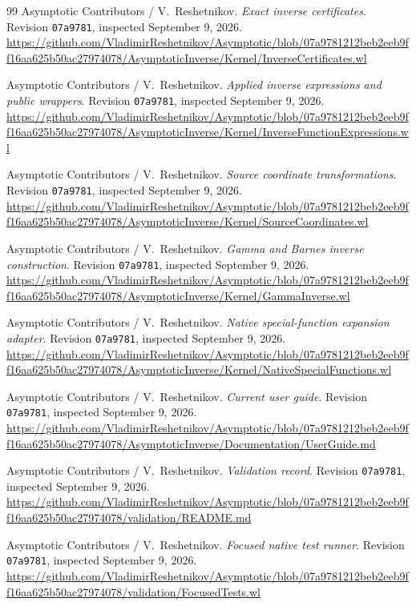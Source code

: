 \documentclass[11pt,a4paper]{article}
\theoremstyle{remark}\newtheorem{remark}[proposition]{Remark}
\begin{document}
\begin{thebibliography}{99}
 Asymptotic Contributors / V.~Reshetnikov. \emph{Exact inverse certificates}. Revision \texttt{07a9781}, inspected September 9, 2026. \url{https://github.com/VladimirReshetnikov/Asymptotic/blob/07a9781212beb2eeb9ff16aa625b50ac27974078/AsymptoticInverse/Kernel/InverseCertificates.wl}

 Asymptotic Contributors / V.~Reshetnikov. \emph{Applied inverse expressions and public wrappers}. Revision \texttt{07a9781}, inspected September 9, 2026. \url{https://github.com/VladimirReshetnikov/Asymptotic/blob/07a9781212beb2eeb9ff16aa625b50ac27974078/AsymptoticInverse/Kernel/InverseFunctionExpressions.wl}

 Asymptotic Contributors / V.~Reshetnikov. \emph{Source coordinate transformations}. Revision \texttt{07a9781}, inspected September 9, 2026. \url{https://github.com/VladimirReshetnikov/Asymptotic/blob/07a9781212beb2eeb9ff16aa625b50ac27974078/AsymptoticInverse/Kernel/SourceCoordinates.wl}

 Asymptotic Contributors / V.~Reshetnikov. \emph{Gamma and Barnes inverse construction}. Revision \texttt{07a9781}, inspected September 9, 2026. \url{https://github.com/VladimirReshetnikov/Asymptotic/blob/07a9781212beb2eeb9ff16aa625b50ac27974078/AsymptoticInverse/Kernel/GammaInverse.wl}

 Asymptotic Contributors / V.~Reshetnikov. \emph{Native special-function expansion adapter}. Revision \texttt{07a9781}, inspected September 9, 2026. \url{https://github.com/VladimirReshetnikov/Asymptotic/blob/07a9781212beb2eeb9ff16aa625b50ac27974078/AsymptoticInverse/Kernel/NativeSpecialFunctions.wl}

 Asymptotic Contributors / V.~Reshetnikov. \emph{Current user guide}. Revision \texttt{07a9781}, inspected September 9, 2026. \url{https://github.com/VladimirReshetnikov/Asymptotic/blob/07a9781212beb2eeb9ff16aa625b50ac27974078/AsymptoticInverse/Documentation/UserGuide.md}

 Asymptotic Contributors / V.~Reshetnikov. \emph{Validation record}. Revision \texttt{07a9781}, inspected September 9, 2026. \url{https://github.com/VladimirReshetnikov/Asymptotic/blob/07a9781212beb2eeb9ff16aa625b50ac27974078/validation/README.md}

 Asymptotic Contributors / V.~Reshetnikov. \emph{Focused native test runner}. Revision \texttt{07a9781}, inspected September 9, 2026. \url{https://github.com/VladimirReshetnikov/Asymptotic/blob/07a9781212beb2eeb9ff16aa625b50ac27974078/validation/FocusedTests.wl}


\end{thebibliography}
\end{document}
